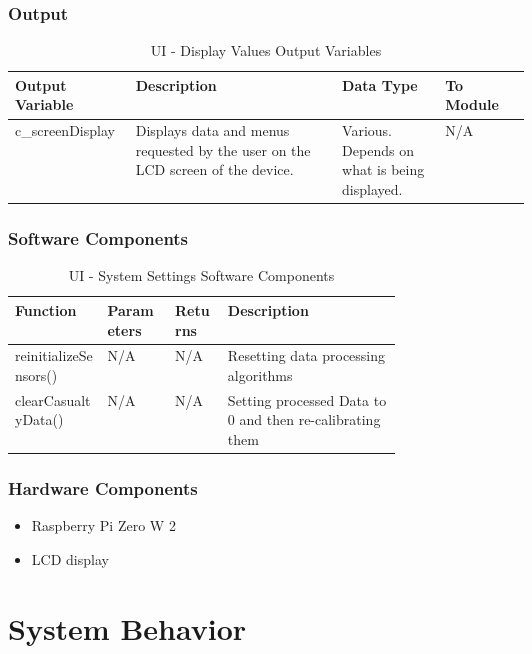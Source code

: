 \documentclass{article}
\begin{document}
\begin{description}
        \subsubsection{Output}
        \begin{longtable}{|l|p{0.4\linewidth}|p{0.2\linewidth}|l|}
           \caption{UI - Display Values Output Variables}
            \hline
            \textbf{Output Variable} & \textbf{Description} & \textbf {Data Type} & \textbf{To Module} \\
            \endhead
            \hline
            c\_screenDisplay   & Displays data and menus requested by the user on the LCD screen of the device. & Various. Depends on what is being displayed. & N/A \\
            \hline
            \end{longtable}
        \subsubsection{Software Components}
                \begin{longtable}{|l|l|l|p{0.45\linewidth}|}
                \caption{UI - System Settings Software Components}
                \hline
                \textbf{Function} & \textbf{Parameters} & \textbf {Returns} & \textbf{Description} \\
                \endhead
                \hline
                reinitializeSensors()   & N/A & N/A & Resetting data processing algorithms \\
                \hline
                clearCasualtyData()   & N/A & N/A & Setting processed Data to 0 and then re-calibrating them \\
                \hline
                \end{longtable}
        \subsubsection{Hardware Components}
            \begin{itemize}
            \item Raspberry Pi Zero W 2
            \item LCD display
            \end{itemize}        
    \end{description}
    \newpage

	\section{System Behavior}
\end{document}
